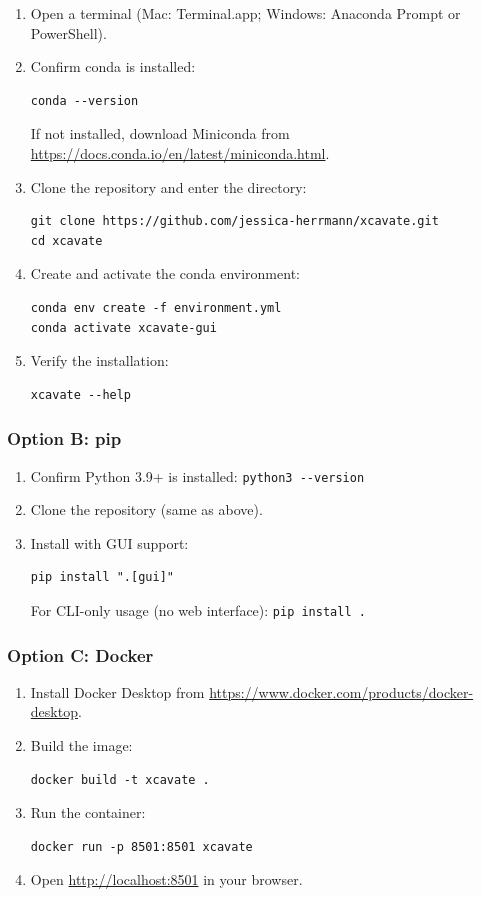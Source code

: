 \documentclass[11pt,letterpaper]{article}
\newcommand{\code}[1]{\texttt{#1}}
\begin{document}
\begin{enumerate}[leftmargin=*]
    \item Open a terminal (Mac: Terminal.app; Windows: Anaconda Prompt or PowerShell).
    \item Confirm conda is installed:
    \begin{lstlisting}
conda --version
    \end{lstlisting}
    If not installed, download Miniconda from \url{https://docs.conda.io/en/latest/miniconda.html}.
    \item Clone the repository and enter the directory:
    \begin{lstlisting}
git clone https://github.com/jessica-herrmann/xcavate.git
cd xcavate
    \end{lstlisting}
    \item Create and activate the conda environment:
    \begin{lstlisting}
conda env create -f environment.yml
conda activate xcavate-gui
    \end{lstlisting}
    \item Verify the installation:
    \begin{lstlisting}
xcavate --help
    \end{lstlisting}
\end{enumerate}

\subsubsection{Option B: pip}

\begin{enumerate}[leftmargin=*]
    \item Confirm Python 3.9+ is installed: \code{python3 -{}-version}
    \item Clone the repository (same as above).
    \item Install with GUI support:
    \begin{lstlisting}
pip install ".[gui]"
    \end{lstlisting}
    For CLI-only usage (no web interface): \code{pip install .}
\end{enumerate}

\subsubsection{Option C: Docker}

\begin{enumerate}[leftmargin=*]
    \item Install Docker Desktop from \url{https://www.docker.com/products/docker-desktop}.
    \item Build the image:
    \begin{lstlisting}
docker build -t xcavate .
    \end{lstlisting}
    \item Run the container:
    \begin{lstlisting}
docker run -p 8501:8501 xcavate
    \end{lstlisting}
    \item Open \url{http://localhost:8501} in your browser.
\end{enumerate}
\end{document}

